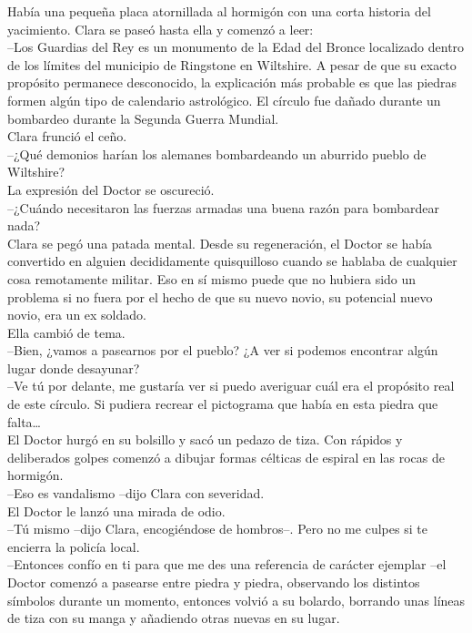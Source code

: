 {Había una pequeña placa atornillada al hormigón con una corta historia
del yacimiento. Clara se paseó hasta ella y comenzó a leer:\\
--Los Guardias del Rey es un monumento de la Edad del Bronce localizado
dentro de los límites del municipio de Ringstone en Wiltshire. A pesar
de que su exacto propósito permanece desconocido, la explicación más
probable es que las piedras formen algún tipo de calendario astrológico.
El círculo fue dañado durante un bombardeo durante la Segunda Guerra
Mundial.\\
Clara frunció el ceño.\\
--¿Qué demonios harían los alemanes bombardeando un aburrido pueblo de
Wiltshire?\\
La expresión del Doctor se oscureció.\\
--¿Cuándo necesitaron las fuerzas armadas una buena razón para
bombardear nada?\\
Clara se pegó una patada mental. Desde su regeneración, el Doctor se
había convertido en alguien decididamente quisquilloso cuando se hablaba
de cualquier cosa remotamente militar. Eso en sí mismo puede que no
hubiera sido un problema si no fuera por el hecho de que su nuevo novio,
su potencial nuevo novio, era un ex soldado.\\
Ella cambió de tema.\\
--Bien, ¿vamos a pasearnos por el pueblo? ¿A ver si podemos encontrar
algún lugar donde desayunar?\\
--Ve tú por delante, me gustaría ver si puedo averiguar cuál era el
propósito real de este círculo. Si pudiera recrear el pictograma que
había en esta piedra que falta\ldots{}\\
El Doctor hurgó en su bolsillo y sacó un pedazo de tiza. Con rápidos y
deliberados golpes comenzó a dibujar formas célticas de espiral en las
rocas de hormigón.\\
--Eso es vandalismo --dijo Clara con severidad.\\
El Doctor le lanzó una mirada de odio.\\
--Tú mismo --dijo Clara, encogiéndose de hombros--. Pero no me culpes si
te encierra la policía local.\\
--Entonces confío en ti para que me des una referencia de carácter
ejemplar --el Doctor comenzó a pasearse entre piedra y piedra,
observando los distintos símbolos durante un momento, entonces volvió a
su bolardo, borrando unas líneas de tiza con su manga y añadiendo otras
nuevas en su lugar.\\
}

